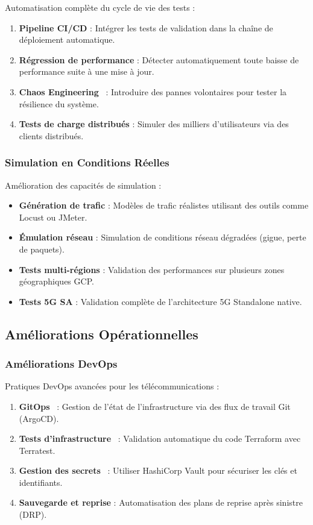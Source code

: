 \documentclass[12pt,a4paper]{report}
\begin{document}
Automatisation complète du cycle de vie des tests :

\begin{enumerate}
    \item \textbf{Pipeline CI/CD} : Intégrer les tests de validation dans la chaîne de déploiement automatique.
    \item \textbf{Régression de performance} : Détecter automatiquement toute baisse de performance suite à une mise à jour.
    \item \textbf{Chaos Engineering}~\cite{chaos-engineering} : Introduire des pannes volontaires pour tester la résilience du système.
    \item \textbf{Tests de charge distribués} : Simuler des milliers d'utilisateurs via des clients distribués.
\end{enumerate}

\subsubsection{Simulation en Conditions Réelles}

Amélioration des capacités de simulation :

\begin{itemize}
    \item \textbf{Génération de trafic} : Modèles de trafic réalistes utilisant des outils comme Locust ou JMeter.
    \item \textbf{Émulation réseau} : Simulation de conditions réseau dégradées (gigue, perte de paquets).
    \item \textbf{Tests multi-régions} : Validation des performances sur plusieurs zones géographiques GCP.
    \item \textbf{Tests 5G SA} : Validation complète de l'architecture 5G Standalone native.
\end{itemize}

\subsection{Améliorations Opérationnelles}

\subsubsection{Améliorations DevOps}

Pratiques DevOps avancées pour les télécommunications :

\begin{enumerate}
    \item \textbf{GitOps}~\cite{gitops} : Gestion de l'état de l'infrastructure via des flux de travail Git (ArgoCD).
    \item \textbf{Tests d'infrastructure}~\cite{terraform-testing} : Validation automatique du code Terraform avec Terratest.
    \item \textbf{Gestion des secrets}~\cite{vault-docs} : Utiliser HashiCorp Vault pour sécuriser les clés et identifiants.
    \item \textbf{Sauvegarde et reprise} : Automatisation des plans de reprise après sinistre (DRP).
\end{enumerate}
\end{document}
